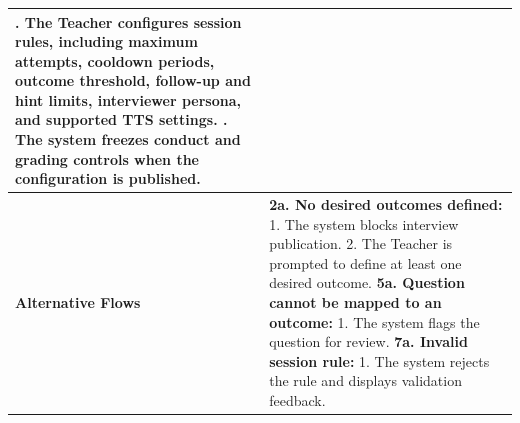 \begin{longtable}{|>{\raggedright\arraybackslash}p{}|>{\raggedright\arraybackslash}p{}|}
7. The Teacher configures session rules, including maximum attempts, cooldown periods, outcome threshold, follow-up and hint limits, interviewer persona, and supported TTS settings. \newline
8. The system freezes conduct and grading controls when the configuration is published. \\ \hline
\textbf{Alternative Flows} &
\textbf{2a. No desired outcomes defined:} \newline
\hspace*{1em}1. The system blocks interview publication. \newline
\hspace*{1em}2. The Teacher is prompted to define at least one desired outcome. \newline
\textbf{5a. Question cannot be mapped to an outcome:} \newline
\hspace*{1em}1. The system flags the question for review. \newline
\textbf{7a. Invalid session rule:} \newline
\hspace*{1em}1. The system rejects the rule and displays validation feedback. \\
\end{longtable}

